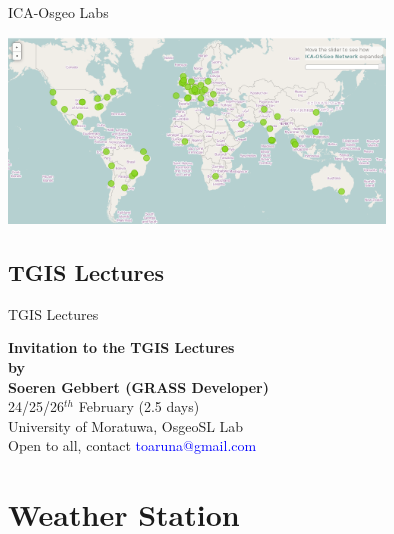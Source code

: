 \documentclass[xcolor=dvipsnames,beamer]{beamer} %
\begin{document}
\begin{frame}[fragile]{ICA-Osgeo Labs}
\begin{center}
\includegraphics[width=10cm]{ica-osgeo-labs-map-feb2014.png}
\end{center}
\end{frame}


\subsection{TGIS Lectures}
\begin{frame}[fragile]{TGIS Lectures}
\begin{center}
{\Large
{\bf
Invitation to the TGIS Lectures \\
\vspace{0.5cm}
by \\
\vspace{0.5cm}
Soeren Gebbert (GRASS Developer)}\\
\vspace{0.5cm}
24/25/26$^{th}$ February (2.5 days)\\
\vspace{0.5cm}
University of Moratuwa, OsgeoSL Lab\\
\vspace{0.5cm}
Open to all, contact \textcolor{blue}{toaruna@gmail.com}
}
\end{center}
\end{frame}

\section{Weather Station}
\end{document}
